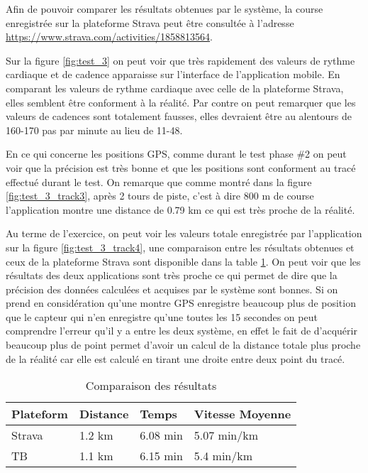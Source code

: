 Afin de pouvoir comparer les résultats obtenues par le système, la course enregistrée sur la plateforme Strava peut être consultée à l'adresse \url{https://www.strava.com/activities/1858813564}.

Sur la figure \ref{fig:test_3} on peut voir que très rapidement des valeurs de rythme cardiaque et de cadence apparaisse sur l'interface de l'application mobile. En comparant les valeurs de rythme cardiaque avec celle de la plateforme Strava, elles semblent être conforment à la réalité. Par contre on peut remarquer que les valeurs de cadences sont totalement fausses, elles devraient être au alentours de 160-170 pas par minute au lieu de 11-48.

En ce qui concerne les positions GPS, comme durant le test phase \#2 on peut voir que la précision est très bonne et que les positions sont conforment au tracé effectué durant le test. On remarque que comme montré dans la figure \ref{fig:test_3_track3}, après 2 tours de piste, c'est à dire 800 m de course l'application montre une distance de 0.79 km ce qui est très proche de la réalité.

Au terme de l'exercice, on peut voir les valeurs totale enregistrée par l'application sur la figure \ref{fig:test_3_track4}, une comparaison entre les résultats obtenues et ceux de la plateforme Strava sont disponible dans la table \ref{tab:comp_results}. On peut voir que les résultats des deux applications sont très proche ce qui permet de dire que la précision des données calculées et acquises par le système sont bonnes. Si on prend en considération qu'une montre GPS enregistre beaucoup plus de position que le capteur qui n'en enregistre qu'une toutes les 15 secondes on peut comprendre l'erreur qu'il y a entre les deux système, en effet le fait de d'acquérir beaucoup plus de point permet d'avoir un calcul de la distance totale plus proche de la réalité car elle est calculé en tirant une droite entre deux point du tracé.

\begin{table}[htb]
\caption{Comparaison des résultats}
\label{tab:comp_results}
\centering
\begin{tabular}{ l l l l }
\toprule
Plateform & Distance & Temps & Vitesse Moyenne  \\
\midrule
Strava & 1.2 km & 6.08 min & 5.07 min/km \\
TB & 1.1 km & 6.15 min & 5.4 min/km \\
\bottomrule 
\end{tabular}
\end{table}

